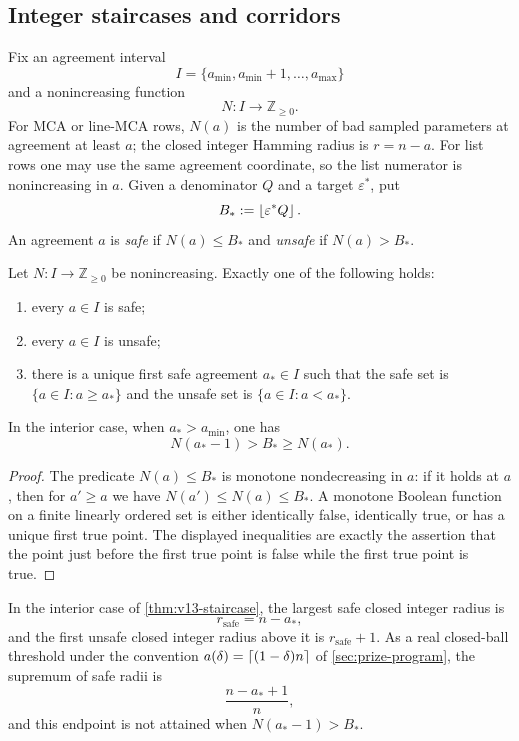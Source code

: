 \subsection{Integer staircases and corridors}

\begin{definition}\label{def:v13-staircase}
Fix an agreement interval
\[
        I=\{a_{\min},a_{\min}+1,\ldots,a_{\max}\}
\]
and a nonincreasing function
\[
        N:I\longrightarrow \mathbb Z_{\ge0}.
\]
For MCA or line-MCA rows, $N(a)$ is the number of bad sampled parameters at agreement at least $a$; the closed integer Hamming radius is $r=n-a$.  For list rows one may use the same agreement coordinate, so the list numerator is nonincreasing in $a$.  Given a denominator $Q$ and a target $\varepsilon^*$, put
\[
        B_*:=\left\lfloor \varepsilon^* Q\right\rfloor.
\]
An agreement $a$ is \emph{safe} if $N(a)\le B_*$ and \emph{unsafe} if $N(a)>B_*$.
\end{definition}

\begin{theorem}\label{thm:v13-staircase}
Let $N:I\to\mathbb Z_{\ge0}$ be nonincreasing.  Exactly one of the following holds:
\begin{enumerate}[label=\textup{(\roman*)}]
\item every $a\in I$ is safe;
\item every $a\in I$ is unsafe;
\item there is a unique first safe agreement $a_*\in I$ such that the safe set is $\{a\in I:a\ge a_*\}$ and the unsafe set is $\{a\in I:a<a_*\}$.
\end{enumerate}
In the interior case, when $a_*>a_{\min}$, one has
\[
        N(a_*-1)>B_*\ge N(a_*).
\]
\end{theorem}

\begin{proof}
The predicate $N(a)\le B_*$ is monotone nondecreasing in $a$: if it holds at $a$, then for $a'\ge a$ we have $N(a')\le N(a)\le B_*$.  A monotone Boolean function on a finite linearly ordered set is either identically false, identically true, or has a unique first true point.  The displayed inequalities are exactly the assertion that the point just before the first true point is false while the first true point is true.
\end{proof}

\begin{corollary}\label{cor:v13-endpoint}
In the interior case of \cref{thm:v13-staircase}, the largest safe closed integer radius is
\[
        r_{\mathrm{safe}}=n-a_*,
\]
and the first unsafe closed integer radius above it is $r_{\mathrm{safe}}+1$.  As a real closed-ball threshold under the convention $a(\delta)=\left\lceil (1-\delta)n\right\rceil$ of \cref{sec:prize-program}, the supremum of safe radii is
\[
        \frac{n-a_*+1}{n},
\]
and this endpoint is not attained when $N(a_*-1)>B_*$.
\end{corollary}

